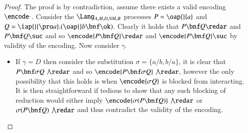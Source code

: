 \documentclass[submission,copyright,creativecommons]{eptcs}
\begin{document}
\begin{proof}
The proof is by contradiction, assume there exists a valid encoding $\encode\cdot$.
Consider the $\Lang_{A,M,D,\mathit{NM},B}$ processes $P=\oap {} {a}$ and
$Q=\iap {} {\pro a} .(\oap {} b \bnf \ok)$.
Clearly it holds that $P\bnf Q\redar$ and $P\bnf Q\suc$ and so
$\encode{P\bnf Q}\redar$ and $\encode{P\bnf Q}\suc$ by validity of the encoding.
Now consider $\gamma$.
\begin{itemize}
\item If $\gamma=D$ then consider 
the substitution $\sigma=\{a/b,b/a\}$, it is clear that $P\bnf \sigma Q\not\redar$
and so $\encode{P\bnf \sigma Q}\not\redar$, however the only possibility that this holds is
when $\encode {\sigma Q}$ is blocked from interacting.
It is then straightforward if tedious to show that any such blocking of reduction would either
imply $\encode {\sigma(P\bnf Q)}\not\redar$ or $\sigma(P\bnf Q)\not\redar$
and thus contradict the validity of the encoding.



\end{itemize}
\end{proof}
\end{document}
